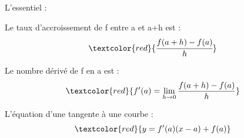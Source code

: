 \documentclass[t]{beamer}
\begin{document}
\begin{frame}{L'essentiel :}
\pause
\begin{exampleblock}{Le taux d'accroissement de f entre a et a+h est :}
\pause
\[\textcolor{red}{ \cfrac{f(a+h) - f(a)}{h} }\]
\pause
\end{exampleblock}
\begin{exampleblock}{Le nombre dérivé de f en a est : }
\pause
\[\textcolor{red}{f'(a) = \lim\limits_{h \rightarrow 0}\dfrac{f(a+h) - f(a)}{h}} \]
\pause
\end{exampleblock}
\begin{exampleblock}{L'équation d'une tangente à une courbe :}
\pause
\[\textcolor{red}{y = f'(a)(x-a)+f(a)} \]
\pause

\end{exampleblock}
\end{frame}
\end{document}
